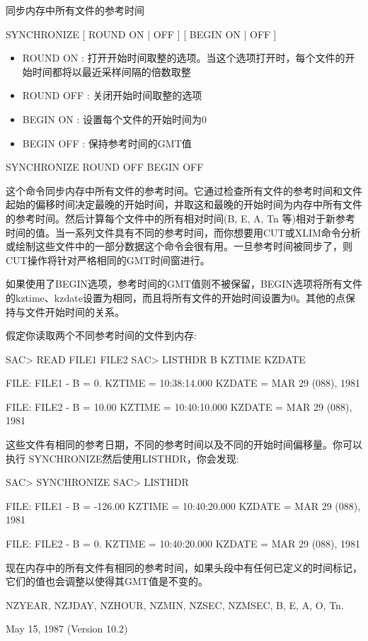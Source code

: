 \label{cmd:synchronize}

同步内存中所有文件的参考时间

SYNCHRONIZE [ ROUND ON | OFF ] [ BEGIN ON | OFF ]

\begin{itemize}
\item ROUND ON : 打开开始时间取整的选项。当这个选项打开时，每个文件的开始时间都将以最近采样间隔的倍数取整
\item ROUND OFF : 关闭开始时间取整的选项 
\item BEGIN {ON} : 设置每个文件的开始时间为0 
\item BEGIN OFF : 保持参考时间的GMT值 
\end{itemize}

SYNCHRONIZE ROUND OFF BEGIN OFF

这个命令同步内存中所有文件的参考时间。它通过检查所有文件的参考时间和文件起始的偏移时间决定最晚的开始时间，并取这和最晚的开始时间为内存中所有文件的参考时间。然后计算每个文件中的所有相对时间(B, E, A, Tn 等)相对于新参考时间的值。当一系列文件具有不同的参考时间，而你想要用CUT或XLIM命令分析或绘制这些文件中的一部分数据这个命令会很有用。一旦参考时间被同步了，则CUT操作将针对严格相同的GMT时间窗进行。

如果使用了BEGIN选项，参考时间的GMT值则不被保留，BEGIN选项将所有文件的kztime、kzdate设置为相同，而且将所有文件的开始时间设置为0。其他的点保持与文件开始时间的关系。

假定你读取两个不同参考时间的文件到内存:
\begin{SACCode}
SAC> READ FILE1 FILE2
SAC> LISTHDR B KZTIME KZDATE

  FILE: FILE1
  -
 B = 0.
 KZTIME = 10:38:14.000
 KZDATE = MAR 29 (088), 1981

  FILE: FILE2
  -
 B = 10.00
 KZTIME = 10:40:10.000
 KZDATE = MAR 29 (088), 1981
\end{SACCode}

这些文件有相同的参考日期，不同的参考时间以及不同的开始时间偏移量。你可以执行	SYNCHRONIZE然后使用LISTHDR，你会发现:
\begin{SACCode}
SAC> SYNCHRONIZE
SAC> LISTHDR

  FILE: FILE1
  -
 B = -126.00
 KZTIME = 10:40:20.000
 KZDATE = MAR 29 (088), 1981

  FILE: FILE2
  -
 B = 0.
 KZTIME = 10:40:20.000
 KZDATE = MAR 29 (088), 1981
\end{SACCode}
现在内存中的所有文件有相同的参考时间，如果头段中有任何已定义的时间标记，它们的值也会调整以使得其GMT值是不变的。

NZYEAR, NZJDAY, NZHOUR, NZMIN, NZSEC, NZMSEC, B, E, A, O, Tn.

May 15, 1987 (Version 10.2)

